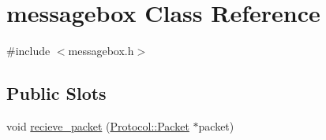 \hypertarget{classmessagebox}{}\section{messagebox Class Reference}
\label{classmessagebox}


{\ttfamily \#include $<$messagebox.\+h$>$}

\subsection*{Public Slots}
\begin{DoxyCompactItemize}
\item 
void \hyperlink{classmessagebox_a7e27018e68e04cfe417386d743a58695}{recieve\+\_\+packet} (\hyperlink{class_protocol_1_1_packet}{Protocol\+::\+Packet} $\ast$packet)
\end{DoxyCompactItemize}
